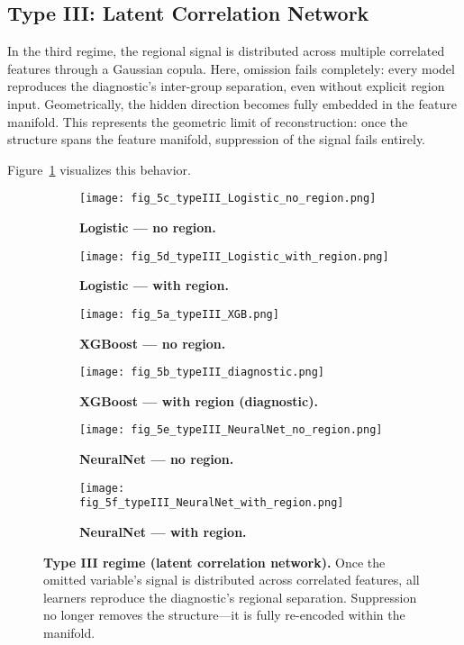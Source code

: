\documentclass[11pt]{article}
\begin{document}
\subsection{Type III: Latent Correlation Network}
In the third regime, the regional signal is distributed across multiple correlated features through a Gaussian copula.  
Here, omission fails completely: every model reproduces the diagnostic’s inter-group separation, even without explicit region input.  
Geometrically, the hidden direction becomes fully embedded in the feature manifold.
This represents the geometric limit of reconstruction:
once the structure spans the feature manifold, 
suppression of the signal fails entirely.

Figure~\ref{fig:typeIII-full} visualizes this behavior.

\begin{figure}[H]
  \centering
   \begin{subfigure}[t]{0.48\textwidth}
    \texttt{[image: fig\_5c\_typeIII\_Logistic\_no\_region.png]}
    \caption{\textbf{Logistic — no region.}}
  \end{subfigure}
  \hfill
  \begin{subfigure}[t]{0.48\textwidth}
    \texttt{[image: fig\_5d\_typeIII\_Logistic\_with\_region.png]}
    \caption{\textbf{Logistic — with region.}}
  \end{subfigure}
  
  \begin{subfigure}[t]{0.48\textwidth}
    \texttt{[image: fig\_5a\_typeIII\_XGB.png]}
    \caption{\textbf{XGBoost — no region.}}
  \end{subfigure}
  \hfill
  \begin{subfigure}[t]{0.48\textwidth}
    \texttt{[image: fig\_5b\_typeIII\_diagnostic.png]}
    \caption{\textbf{XGBoost — with region (diagnostic).}}
  \end{subfigure}

  \begin{subfigure}[t]{0.48\textwidth}
    \texttt{[image: fig\_5e\_typeIII\_NeuralNet\_no\_region.png]}
    \caption{\textbf{NeuralNet — no region.}}
  \end{subfigure}
  \hfill
  \begin{subfigure}[t]{0.48\textwidth}
    \texttt{[image: fig\_5f\_typeIII\_NeuralNet\_with\_region.png]}
    \caption{\textbf{NeuralNet — with region.}}
  \end{subfigure}

  \caption{\textbf{Type III regime (latent correlation network).}
  Once the omitted variable’s signal is distributed across correlated features,
  all learners reproduce the diagnostic’s regional separation.  
  Suppression no longer removes the structure—it is fully re-encoded within the manifold.}
  \label{fig:typeIII-full}
\end{figure}
\end{document}
